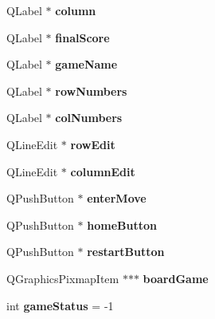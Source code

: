 \begin{DoxyCompactItemize}
\item 
\hypertarget{classGame2scene_aa9250f1765d7c6d4f10cd31735440bbe}{Q\-Label $\ast$ {\bfseries column}}\label{classGame2scene_aa9250f1765d7c6d4f10cd31735440bbe}

\item 
\hypertarget{classGame2scene_a2e55d1c496f520b7b947d6f172b78936}{Q\-Label $\ast$ {\bfseries final\-Score}}\label{classGame2scene_a2e55d1c496f520b7b947d6f172b78936}

\item 
\hypertarget{classGame2scene_a64398d57b719a9f0988644d5f216dc1f}{Q\-Label $\ast$ {\bfseries game\-Name}}\label{classGame2scene_a64398d57b719a9f0988644d5f216dc1f}

\item 
\hypertarget{classGame2scene_a679ac7cdbe944211fd6e691d2586ba0a}{Q\-Label $\ast$ {\bfseries row\-Numbers}}\label{classGame2scene_a679ac7cdbe944211fd6e691d2586ba0a}

\item 
\hypertarget{classGame2scene_a6105168ba444e82a4245bfcbf07d1e21}{Q\-Label $\ast$ {\bfseries col\-Numbers}}\label{classGame2scene_a6105168ba444e82a4245bfcbf07d1e21}

\item 
\hypertarget{classGame2scene_a49f2bb5c4e1e4660506fbfec5a5c6c1d}{Q\-Line\-Edit $\ast$ {\bfseries row\-Edit}}\label{classGame2scene_a49f2bb5c4e1e4660506fbfec5a5c6c1d}

\item 
\hypertarget{classGame2scene_ae0c7376c62ad8fb669bc3a6fedf429a4}{Q\-Line\-Edit $\ast$ {\bfseries column\-Edit}}\label{classGame2scene_ae0c7376c62ad8fb669bc3a6fedf429a4}

\item 
\hypertarget{classGame2scene_a6a69bd47926bf33845f59b6e08a2d42d}{Q\-Push\-Button $\ast$ {\bfseries enter\-Move}}\label{classGame2scene_a6a69bd47926bf33845f59b6e08a2d42d}

\item 
\hypertarget{classGame2scene_a31108de508257e90666bc180f9d4cc01}{Q\-Push\-Button $\ast$ {\bfseries home\-Button}}\label{classGame2scene_a31108de508257e90666bc180f9d4cc01}

\item 
\hypertarget{classGame2scene_a1ab905edfb95dcc9385ab11951c9e564}{Q\-Push\-Button $\ast$ {\bfseries restart\-Button}}\label{classGame2scene_a1ab905edfb95dcc9385ab11951c9e564}

\item 
\hypertarget{classGame2scene_a97b9cd4f181babf7731cab15b59a61ac}{Q\-Graphics\-Pixmap\-Item $\ast$$\ast$$\ast$ {\bfseries board\-Game}}\label{classGame2scene_a97b9cd4f181babf7731cab15b59a61ac}

\item 
\hypertarget{classGame2scene_ae50096081fc348256d987f71f79c0487}{int {\bfseries game\-Status} = -\/1}\label{classGame2scene_ae50096081fc348256d987f71f79c0487}

\end{DoxyCompactItemize}


